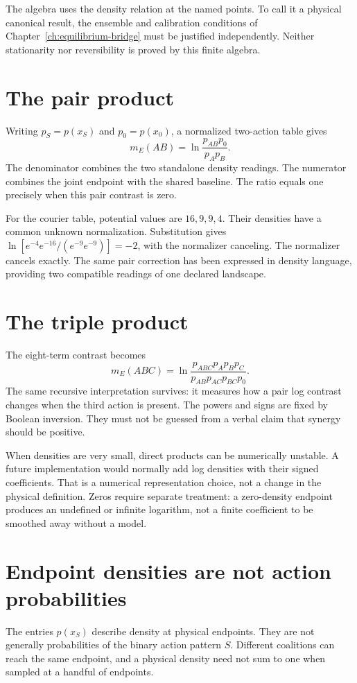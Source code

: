The algebra uses the density relation at the named points. To call it a physical canonical result, the ensemble and calibration conditions of Chapter~\ref{ch:equilibrium-bridge} must be justified independently. Neither stationarity nor reversibility is proved by this finite algebra.

\section{The pair product}
Writing $p_S=p(x_S)$ and $p_0=p(x_0)$, a normalized two-action table gives
\begin{equation}\label{eq:pair-log-product}
 m_E(AB)=\ln\frac{p_{AB}p_0}{p_Ap_B}.
\end{equation}
The denominator combines the two standalone density readings. The numerator combines the joint endpoint with the shared baseline. The ratio equals one precisely when this pair contrast is zero.

For the courier table, potential values are $16,9,9,4$. Their densities have a common unknown normalization. Substitution gives
$\ln[e^{-4}e^{-16}/(e^{-9}e^{-9})]=-2$, with the normalizer canceling. The normalizer cancels exactly. The same pair correction has been expressed in density language, providing two compatible readings of one declared landscape.

\section{The triple product}
The eight-term contrast becomes
\begin{equation}\label{eq:triple-log-product}
 m_E(ABC)=\ln
 \frac{p_{ABC}p_Ap_Bp_C}{p_{AB}p_{AC}p_{BC}p_0}.
\end{equation}
The same recursive interpretation survives: it measures how a pair log contrast changes when the third action is present. The powers and signs are fixed by Boolean inversion. They must not be guessed from a verbal claim that synergy should be positive.

When densities are very small, direct products can be numerically unstable. A future implementation would normally add log densities with their signed coefficients. That is a numerical representation choice, not a change in the physical definition. Zeros require separate treatment: a zero-density endpoint produces an undefined or infinite logarithm, not a finite coefficient to be smoothed away without a model.

\section{Endpoint densities are not action probabilities}
The entries $p(x_S)$ describe density at physical endpoints. They are not generally probabilities of the binary action pattern $S$. Different coalitions can reach the same endpoint, and a physical density need not sum to one when sampled at a handful of endpoints.

